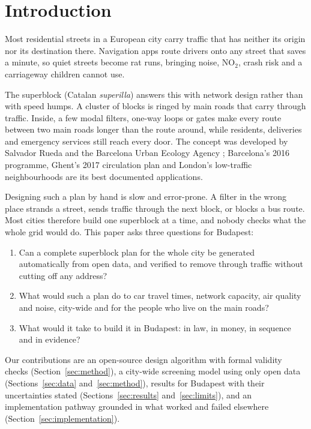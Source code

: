 \documentclass[11pt,a4paper]{article}
\begin{document}
\section{Introduction}

Most residential streets in a European city carry traffic that has neither its origin nor its destination there. Navigation apps route drivers onto any street that saves a minute, so quiet streets become rat runs, bringing noise, NO$_2$, crash risk and a carriageway children cannot use.

The superblock (Catalan \emph{superilla}) answers this with network design rather than with speed humps. A cluster of blocks is ringed by main roads that carry through traffic. Inside, a few modal filters, one-way loops or gates make every route between two main roads longer than the route around, while residents, deliveries and emergency services still reach every door. The concept was developed by Salvador Rueda and the Barcelona Urban Ecology Agency \citep{rueda2019}; Barcelona's 2016 programme, Ghent's 2017 circulation plan and London's low-traffic neighbourhoods are its best documented applications.

Designing such a plan by hand is slow and error-prone. A filter in the wrong place strands a street, sends traffic through the next block, or blocks a bus route. Most cities therefore build one superblock at a time, and nobody checks what the whole grid would do. This paper asks three questions for Budapest:
\begin{enumerate}
  \item Can a complete superblock plan for the whole city be generated automatically from open data, and verified to remove through traffic without cutting off any address?
  \item What would such a plan do to car travel times, network capacity, air quality and noise, city-wide and for the people who live on the main roads?
  \item What would it take to build it in Budapest: in law, in money, in sequence and in evidence?
\end{enumerate}
Our contributions are an open-source design algorithm with formal validity checks (Section~\ref{sec:method}), a city-wide screening model using only open data (Sections~\ref{sec:data} and~\ref{sec:method}), results for Budapest with their uncertainties stated (Sections~\ref{sec:results} and~\ref{sec:limits}), and an implementation pathway grounded in what worked and failed elsewhere (Section~\ref{sec:implementation}).
\end{document}
